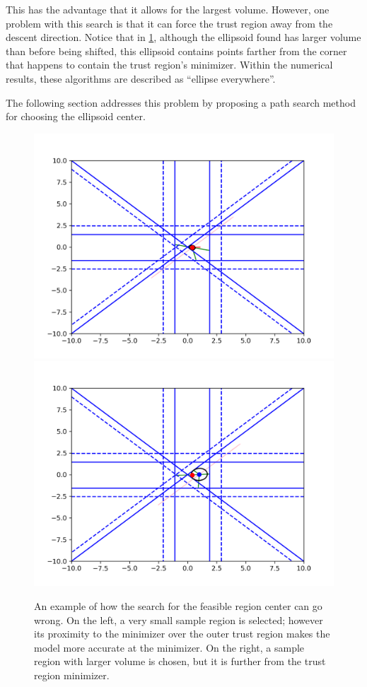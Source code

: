 This has the advantage that it allows for the largest volume.
However, one problem with this search is that it can force the trust region away from the descent direction.
Notice that in \cref{ellipse_runs_away}, although the ellipsoid found has larger volume than before being shifted, 
this ellipsoid contains points farther from the corner that happens to contain the trust region's minimizer.
Within the numerical results, these algorithms are described as ``ellipse everywhere''.

The following section addresses this problem by proposing a path search method for choosing the ellipsoid center.

\begin{figure}[ht]
    \centering
    \includegraphics[scale=0.4]{images/everything_runs_1.png}
    \includegraphics[scale=0.4]{images/everything_runs_2.png}
    \caption[An example of how the search for the sample region center can go wrong.]{
    	An example of how the search for the feasible region center can go wrong.  
     	On the left, a very small sample region is selected; however its proximity to the minimizer over the outer trust region makes the model more accurate at the minimizer.
    	On the right, a sample region with larger volume is chosen, but it is further from the trust region minimizer.
	}
    \label{ellipse_runs_away}
\end{figure}


